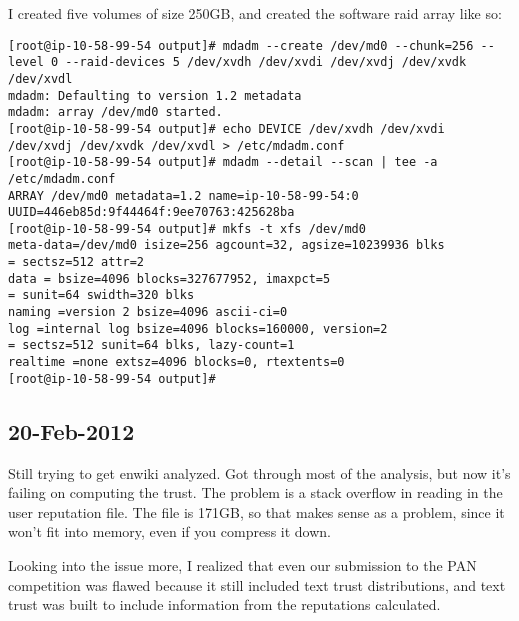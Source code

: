 I created five volumes of size 250GB, and created the software raid
array like so:

\begin{verbatim}
[root@ip-10-58-99-54 output]# mdadm --create /dev/md0 --chunk=256 --level 0 --raid-devices 5 /dev/xvdh /dev/xvdi /dev/xvdj /dev/xvdk /dev/xvdl
mdadm: Defaulting to version 1.2 metadata
mdadm: array /dev/md0 started.
[root@ip-10-58-99-54 output]# echo DEVICE /dev/xvdh /dev/xvdi /dev/xvdj /dev/xvdk /dev/xvdl > /etc/mdadm.conf
[root@ip-10-58-99-54 output]# mdadm --detail --scan | tee -a /etc/mdadm.conf
ARRAY /dev/md0 metadata=1.2 name=ip-10-58-99-54:0
UUID=446eb85d:9f44464f:9ee70763:425628ba
[root@ip-10-58-99-54 output]# mkfs -t xfs /dev/md0
meta-data=/dev/md0 isize=256 agcount=32, agsize=10239936 blks
= sectsz=512 attr=2
data = bsize=4096 blocks=327677952, imaxpct=5
= sunit=64 swidth=320 blks
naming =version 2 bsize=4096 ascii-ci=0
log =internal log bsize=4096 blocks=160000, version=2
= sectsz=512 sunit=64 blks, lazy-count=1
realtime =none extsz=4096 blocks=0, rtextents=0
[root@ip-10-58-99-54 output]#
\end{verbatim}

\subsection{20-Feb-2012}

Still trying to get enwiki analyzed.  Got through most of the analysis,
but now it's failing on computing the trust.
The problem is a stack overflow in reading in the user reputation file.
The file is 171GB, so that makes sense as a problem, since it won't
fit into memory, even if you compress it down.

Looking into the issue more, I realized that even our submission to
the PAN competition was flawed because it still included text trust
distributions, and text trust was built to include information from
the reputations calculated.
